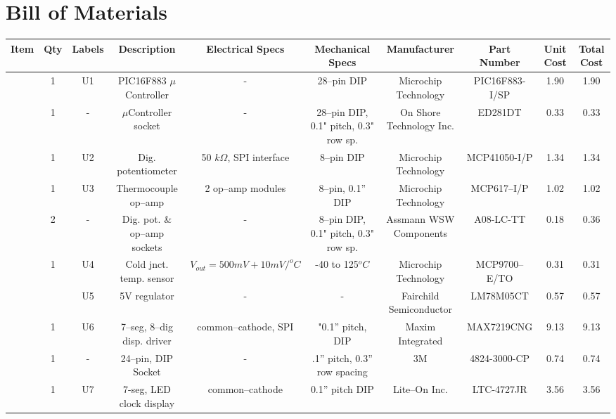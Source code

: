\documentclass[10pt, twocolumn]{article}
\begin{document}
\pagebreak
\section{Bill of Materials}

\begin{center}
\begin{adjustbox}{max width=\textwidth}
\begin{tabular}{c c c c c c c c c c}
\hline\hline
Item	&Qty	&Labels	&Description		&Electrical Specs		&Mechanical Specs
	&Manufacturer		&Part Number		&Unit Cost	&Total Cost	\\
\hline

	&1	&U1	&PIC16F883 $\mu$Controller	&-				&28--pin DIP
	&Microchip Technology	&PIC16F883-I/SP		&1.90		&1.90	\\

	&1	&-	&$\mu$Controller socket		&-				&28--pin DIP, 0.1" pitch, 0.3" row sp.
	&On Shore Technology Inc.	&ED281DT	&0.33		&0.33	\\

	&1	&U2	&Dig. potentiometer		&50 $k\Omega$, SPI interface	&8--pin DIP
	&Microchip Technology	&MCP41050-I/P		&1.34		&1.34	\\

	&1	&U3	&Thermocouple op--amp	&2 op--amp modules			&8--pin, 0.1” DIP
	&Microchip Technology	&MCP617--I/P		&1.02		&1.02	\\
	
	&2	&-	&Dig. pot. \& op--amp sockets	&-				&8--pin DIP, 0.1" pitch, 0.3" row sp.
	&Assmann WSW Components	&A08-LC-TT		&0.18		&0.36	\\

	&1	&U4	&Cold jnct. temp. sensor	&$V_{out}=500mV+10mV/^{o}C$ 	&-40 to 125$^{o}C$
	&Microchip Technology	&MCP9700--E/TO		&0.31		&0.31	\\

	&	&U5	&5V regulator			&-				&-
	&Fairchild Semiconductor	&LM78M05CT	&0.57		&0.57	\\

	&1	&U6	&7--seg, 8--dig disp. driver	&common--cathode, SPI	&"0.1” pitch, DIP
	&Maxim Integrated	&MAX7219CNG		&9.13		&9.13	\\

	&1	&-	&24--pin, DIP Socket		&-				&.1” pitch, 0.3” row spacing
	&3M		&4824-3000-CP			&0.74		&0.74	\\

	&1	&U7	&7-seg, LED clock display	&common--cathode		&0.1” pitch DIP
	&Lite--On Inc.		&LTC-4727JR		&3.56		&3.56	\\


\end{tabular}
\end{adjustbox}
\end{center}
\end{document}
